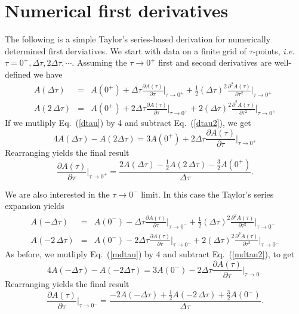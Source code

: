 \chapter{Numerical first derivatives}

The following is a simple Taylor's series-based derivation
for numerically determined first derviatives.
We start with data on a finite grid of $\tau$-points,
\textit{i.e.} $\tau = 0^+, \Delta \tau, 2 \Delta \tau, \cdots$.
Assuming the $\tau \to 0^+$ first and second derivatives
are well-defined we have
\begin{eqnarray}
\label{dtau}
A(\Delta \tau) & = & A(0^+) + 
\Delta \tau \frac{\partial 
A(\tau)}{\partial \tau}{\bigg\vert}_{\tau \to 0^+} +
\frac{1}{2}(\Delta \tau)^2 
\frac{\partial^2 A(\tau)}{\partial \tau^2} {\bigg\vert}_{\tau \to 0^+} \\
\label{dtau2}
A(2\, \Delta \tau) & = &  A(0^+) + 
2 \Delta \tau 
\frac{\partial A(\tau)}{\partial \tau} {\bigg\vert}_{\tau \to 0^+} +
2 (\Delta \tau)^2 
\frac{\partial^2 A(\tau)}{\partial \tau^2} {\bigg\vert}_{\tau \to 0^+}
\end{eqnarray}
If we mutliply Eq.~(\ref{dtau}) by 4 and subtract Eq.~(\ref{dtau2}),
we get
\begin{equation}
4 A(\Delta \tau) - A(2 \Delta \tau) = 3 A(0^+) + 
2 \Delta \tau 
\frac{\partial A(\tau)}{\partial \tau} {\bigg\vert}_{\tau \to 0^+}
\end{equation}
Rearranging yields the final result
\begin{equation}
\frac{\partial A(\tau)}{\partial \tau} {\bigg\vert}_{\tau \to 0^+}
= \frac{2 A(\Delta\tau) - \frac{1}{2} A(2\,\Delta\tau)
- \frac{3}{2} A(0^+)}{\Delta \tau}.
\end{equation}

We are also interested in the $\tau \to 0^-$ limit.  In this
case the Taylor's series expansion yields
\begin{eqnarray}
\label{mdtau}
A(-\Delta \tau) & = & A(0^-) -
\Delta \tau \frac{\partial 
A(\tau)}{\partial \tau}{\bigg\vert}_{\tau \to 0^-} +
\frac{1}{2}(\Delta \tau)^2 
\frac{\partial^2 A(\tau)}{\partial \tau^2} {\bigg\vert}_{\tau \to 0^-} \\
\label{mdtau2}
A(-2\, \Delta \tau) & = &  A(0^-) -
2 \Delta \tau 
\frac{\partial A(\tau)}{\partial \tau} {\bigg\vert}_{\tau \to 0^-} +
2 (\Delta \tau)^2 
\frac{\partial^2 A(\tau)}{\partial \tau^2} {\bigg\vert}_{\tau \to 0^-}
\end{eqnarray}
As before, we mutliply Eq.~(\ref{mdtau}) by 4 and subtract 
Eq.~(\ref{mdtau2}),
to get
\begin{equation}
4 A(-\Delta \tau) - A(-2 \Delta \tau) = 3 A(0^-) - 
2 \Delta \tau 
\frac{\partial A(\tau)}{\partial \tau} {\bigg\vert}_{\tau \to 0^-}
\end{equation}
Rearranging yields the final result
\begin{equation}
\frac{\partial A(\tau)}{\partial \tau} {\bigg\vert}_{\tau \to 0^-}
= \frac{-2 A(-\Delta\tau) + \frac{1}{2} A(-2\,\Delta\tau)
+ \frac{3}{2} A(0^-)}{\Delta \tau}.
\end{equation}
